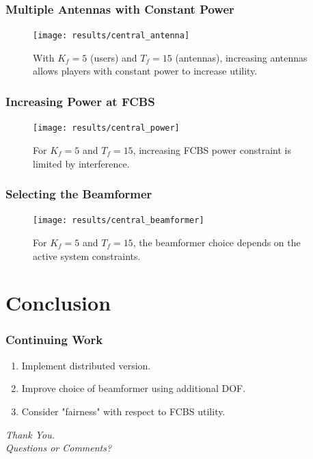 \documentclass[10pt,tgadventor, onlymath]{beamer}
\begin{document}


\begin{frame}
\frametitle{Multiple Antennas with Constant Power}
\begin{figure}
	\texttt{[image: results/central\_antenna]}
	\caption{With $K_f = 5$ (users) and $T_f = 15$ (antennas), increasing antennas allows players with constant power to increase utility.}
\end{figure}
\end{frame}

\begin{frame}
\frametitle{Increasing Power at FCBS}
\begin{figure}
	\texttt{[image: results/central\_power]}
	\caption{For $K_f = 5$ and $T_f = 15$, increasing FCBS power constraint is limited by interference.}
\end{figure}
\end{frame}

\begin{frame}
\frametitle{Selecting the Beamformer}
\begin{figure}
	\texttt{[image: results/central\_beamformer]}
\caption{For $K_f = 5$ and $T_f = 15$, the beamformer choice depends on the active system constraints.}
\end{figure}
\end{frame}

\section{Conclusion}
\begin{frame}
\frametitle{Continuing Work}
\begin{enumerate}
\item
	Implement distributed version.
\item
	Improve choice of beamformer using additional DOF. 
\item
	Consider "fairness" with respect to FCBS utility.
\end{enumerate}
\end{frame}

\begin{frame}
  \centering \Large
  \emph{Thank You.}
  \\
	\bigskip
    \centering \Large
  \emph{Questions or Comments?}
\end{frame}
\end{document}
